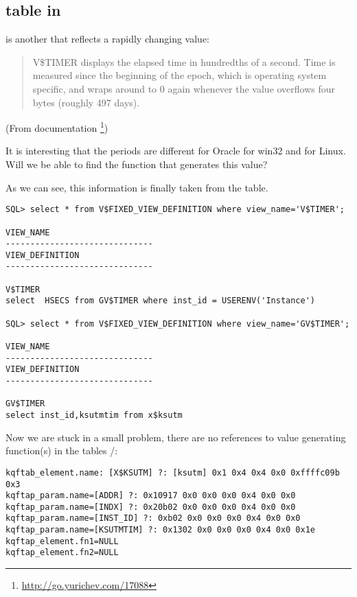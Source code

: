 \subsection{ table in \oracle}
\myindex{\oracle}

is another  that reflects a rapidly changing value:

\begin{framed}
\begin{quotation}
V\$TIMER displays the elapsed time in hundredths of a second. Time is measured since the beginning of the epoch, 
which is operating system specific, and wraps around to 0 again whenever the value overflows four bytes 
(roughly 497 days).
\end{quotation}
\end{framed}(From \oracle documentation
\footnote{\url{http://go.yurichev.com/17088}})


It is interesting that the periods are different for Oracle for win32 and for Linux. 
Will we be able to find the function that generates this value?

As we can see, 
this information is finally taken from the  table.

\begin{lstlisting}
SQL> select * from V$FIXED_VIEW_DEFINITION where view_name='V$TIMER';

VIEW_NAME
------------------------------
VIEW_DEFINITION
------------------------------

V$TIMER
select  HSECS from GV$TIMER where inst_id = USERENV('Instance')

SQL> select * from V$FIXED_VIEW_DEFINITION where view_name='GV$TIMER';

VIEW_NAME
------------------------------
VIEW_DEFINITION
------------------------------

GV$TIMER
select inst_id,ksutmtim from x$ksutm
\end{lstlisting}

Now we are stuck in a small problem, there are no references to value generating function(s) 
in the tables /:

\begin{lstlisting}[caption=Result of \OracleTablesName]
kqftab_element.name: [X$KSUTM] ?: [ksutm] 0x1 0x4 0x4 0x0 0xffffc09b 0x3
kqftap_param.name=[ADDR] ?: 0x10917 0x0 0x0 0x0 0x4 0x0 0x0
kqftap_param.name=[INDX] ?: 0x20b02 0x0 0x0 0x0 0x4 0x0 0x0
kqftap_param.name=[INST_ID] ?: 0xb02 0x0 0x0 0x0 0x4 0x0 0x0
kqftap_param.name=[KSUTMTIM] ?: 0x1302 0x0 0x0 0x0 0x4 0x0 0x1e
kqftap_element.fn1=NULL
kqftap_element.fn2=NULL
\end{lstlisting}

